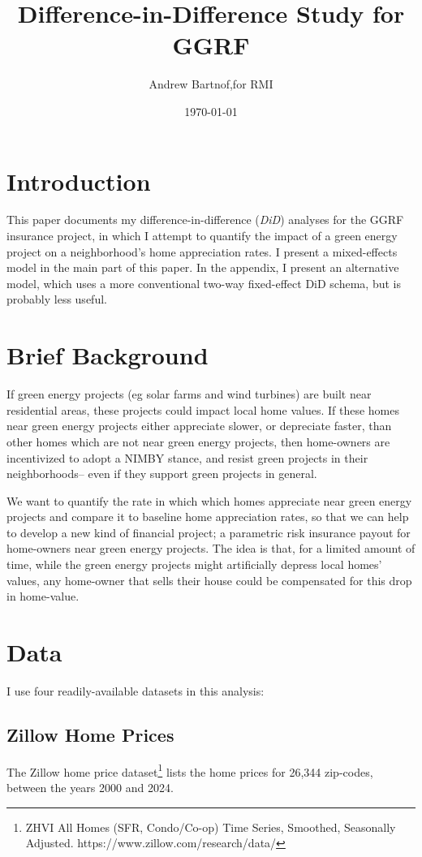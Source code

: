 \documentclass{article}
\begin{document}
\author{Andrew Bartnof,for RMI}
\title{Difference-in-Difference Study for GGRF}
\date{\today}
\maketitle

\section{Introduction}

This paper documents my difference-in-difference (\emph{DiD}) analyses for the GGRF insurance project, in which I attempt to quantify the impact of a green energy project on a neighborhood's home appreciation rates.
I present a mixed-effects model in the main part of this paper.
In the appendix, I present an alternative model, which uses a more conventional two-way fixed-effect DiD schema, but is probably less useful.

\section{Brief Background}

If green energy projects (eg solar farms and wind turbines) are built near residential areas, these projects could impact local home values.
If these homes near green energy projects either appreciate slower, or depreciate faster, than other homes which are not near green energy projects, then home-owners are incentivized to adopt a NIMBY stance, and resist green projects in their neighborhoods-- even if they support green projects in general.

We want to quantify the rate in which which homes appreciate near green energy projects and compare it to baseline home appreciation rates, so that we can help to develop a new kind of financial project; a parametric risk insurance payout for home-owners near green energy projects.
The idea is that, for a limited amount of time, while the green energy projects might artificially depress local homes' values, any home-owner that sells their house could be compensated for this drop in home-value.


\section{Data}

I use four readily-available datasets in this analysis:

\subsection{Zillow Home Prices}
The Zillow home price dataset\footnote{ZHVI All Homes (SFR, Condo/Co-op) Time Series, Smoothed, Seasonally Adjusted. https://www.zillow.com/research/data/} lists the home prices for 26,344 zip-codes, between the years 2000 and 2024.
\end{document}
